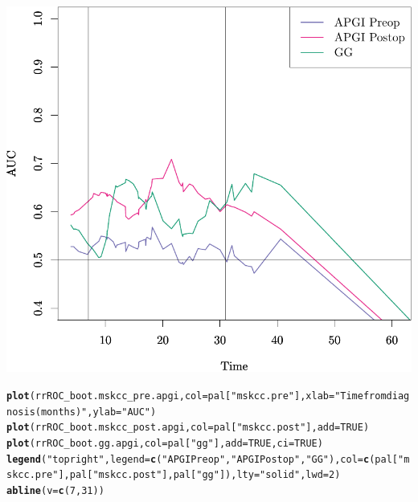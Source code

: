 \documentclass{article}\usepackage[]{graphicx}\usepackage[]{color}
\makeatletter
\def\maxwidth{ %
  \ifdim\Gin@nat@width>\linewidth
    \linewidth
  \else
    \Gin@nat@width
  \fi
}
\newcommand{\hlnum}[1]{\textcolor[rgb]{0.686,0.059,0.569}{#1}}%
\newcommand{\hlstr}[1]{\textcolor[rgb]{0.192,0.494,0.8}{#1}}%
\newcommand{\hlstd}[1]{\textcolor[rgb]{0.345,0.345,0.345}{#1}}%
\newcommand{\hlkwc}[1]{\textcolor[rgb]{0.333,0.667,0.333}{#1}}%
\newcommand{\hlkwd}[1]{\textcolor[rgb]{0.737,0.353,0.396}{\textbf{#1}}}%
\newenvironment{kframe}{%
 \def\at@end@of@kframe{}%
 \ifinner\ifhmode%
  \def\at@end@of@kframe{\end{minipage}}%
  \begin{minipage}{\columnwidth}%
 \fi\fi%
 \def\FrameCommand##1{\hskip\@totalleftmargin \hskip-\fboxsep
 \colorbox{shadecolor}{##1}\hskip-\fboxsep
     \hskip-\linewidth \hskip-\@totalleftmargin \hskip\columnwidth}%
 \MakeFramed {\advance\hsize-\width
   \@totalleftmargin\z@ \linewidth\hsize
   \@setminipage}}%
 {\par\unskip\endMakeFramed%
 \at@end@of@kframe}
\newenvironment{knitrout}{}{} %
\makeatother
\begin{document}
\begin{knitrout}
{\centering \includegraphics[width=\maxwidth]{figure/07-risksetROC-plot-apgi-1} 

}


\begin{kframe}\begin{alltt}
\hlkwd{plot}\hlstd{(rrROC_boot.mskcc_pre.apgi,} \hlkwc{col} \hlstd{= pal[}\hlstr{"mskcc.pre"}\hlstd{],} \hlkwc{xlab} \hlstd{=} \hlstr{"Time from diagnosis (months)"}\hlstd{,} \hlkwc{ylab} \hlstd{=} \hlstr{"AUC"}\hlstd{)}
\hlkwd{plot}\hlstd{(rrROC_boot.mskcc_post.apgi,} \hlkwc{col} \hlstd{= pal[}\hlstr{"mskcc.post"}\hlstd{],} \hlkwc{add} \hlstd{=} \hlnum{TRUE}\hlstd{)}
\hlkwd{plot}\hlstd{(rrROC_boot.gg.apgi,} \hlkwc{col} \hlstd{= pal[}\hlstr{"gg"}\hlstd{],} \hlkwc{add} \hlstd{=} \hlnum{TRUE}\hlstd{,} \hlkwc{ci} \hlstd{=} \hlnum{TRUE}\hlstd{)}
\hlkwd{legend}\hlstd{(}\hlstr{"topright"}\hlstd{,} \hlkwc{legend} \hlstd{=} \hlkwd{c}\hlstd{(}\hlstr{"APGI Preop"}\hlstd{,} \hlstr{"APGI Postop"}\hlstd{,} \hlstr{"GG"}\hlstd{),} \hlkwc{col} \hlstd{=} \hlkwd{c}\hlstd{(pal[}\hlstr{"mskcc.pre"}\hlstd{], pal[}\hlstr{"mskcc.post"}\hlstd{], pal[}\hlstr{"gg"}\hlstd{]),} \hlkwc{lty} \hlstd{=} \hlstr{"solid"}\hlstd{,} \hlkwc{lwd} \hlstd{=} \hlnum{2}\hlstd{)}
\hlkwd{abline}\hlstd{(}\hlkwc{v} \hlstd{=} \hlkwd{c}\hlstd{(}\hlnum{7}\hlstd{,} \hlnum{31}\hlstd{))}
\end{alltt}
\end{kframe}


\end{knitrout}
\end{document}
